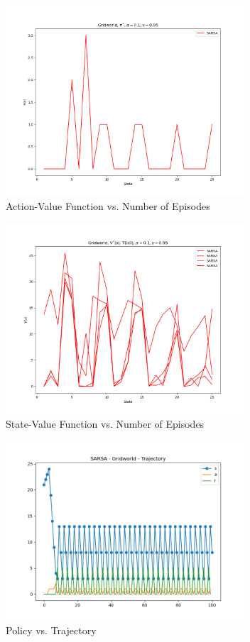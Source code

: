 \documentclass[conference]{IEEEtran}
\begin{document}
\begin{figure}[!htbp]
\centerline{\includegraphics[width=3.5in]{g_sarsa_policy}}
\caption{Action-Value Function vs. Number of Episodes}
\label{fig}
\end{figure}
\FloatBarrier

\begin{figure}[!htbp]
\centerline{\includegraphics[width=3.5in]{g_sarsa_state_value}}
\caption{State-Value Function vs. Number of Episodes}
\label{fig}
\end{figure}
\FloatBarrier

\begin{figure}[!htbp]
\centerline{\includegraphics[width=3.5in]{g_sarsa_policy_vs_trajec}}
\caption{Policy vs. Trajectory}
\label{fig}
\end{figure}
\FloatBarrier
\end{document}
